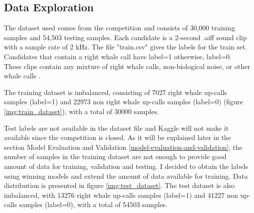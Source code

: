 \documentclass[]{article}
\begin{document}
\subsection{Data Exploration}\label{data-exploration}

The dataset used comes from the competition and consists of 30,000 training samples and 54,503 testing samples. Each candidate is a 2-second .aiff sound clip with a sample rate of 2 kHz. The file "train.csv" gives the labels for the train set. Candidates that contain a right whale call have label=1 otherwise, label=0. These clips contain any mixture of right whale calls, non-biological noise, or other whale calls \cite{CornellWeb, CornellWeb2}. 

The training dataset is imbalanced, consisting of 7027 right whale up-calls samples (label=1) and 22973 non right whale up-calls samples (label=0) (figure \ref{img:train_dataset}), with a total of 30000 samples. %

Test labels are not available in the dataset file and Kaggle will not make it available since the competition is closed. As it will be explained later in the section Model Evaluation and Validation \ref{model-evaluation-and-validation}, the number of samples in the training dataset are not enough to provide good amount of data for training, validation and testing. I decided to obtain the labels using winning models and extend the amount of data available for training. Data distribution is presented in figure \ref{img:test_dataset}. The test dataset is also imbalanced, with 13276 right whale up-calls samples (label=1) and 41227 non up-calls samples (label=0), with a total of 54503 samples. %
\end{document}
